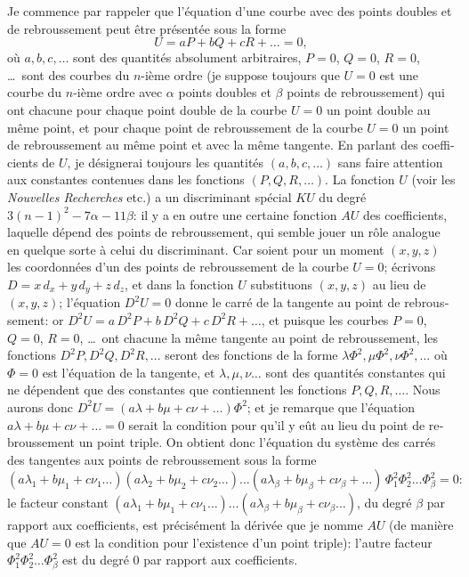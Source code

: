 \documentclass[11pt,a4paper]{article}
\begin{document}
\begin{otherlanguage}{french}
Je commence par rappeler que l'\'equation d'une courbe avec des points doubles et de rebroussement peut \^etre pr\'esent\'ee sous la forme
\[
U = aP + bQ + cR + \ldots = 0,
\]
o\`u $a, b, c, \ldots$ sont des quantit\'es absolument arbitraires, $P = 0$, $Q = 0$, $R = 0$, \ldots\ sont des courbes du $n$-i\`eme ordre (je suppose toujours que $U = 0$ est une courbe du $n$-i\`eme ordre avec $\alpha$ points doubles et $\beta$ points de rebroussement) qui ont chacune pour chaque point double de la courbe $U = 0$ un point double au m\^eme point, et pour chaque point de rebroussement de la courbe $U = 0$ un point de rebroussement au m\^eme point et avec la m\^eme tangente. En parlant des coefficients de $U$, je d\'esignerai toujours les quantit\'es $(a, b, c, \ldots)$ sans faire attention aux constantes contenues dans les fonctions $(P, Q, R, \ldots)$. La fonction $U$ (voir les \textit{Nouvelles Recherches} etc.) a un discriminant sp\'ecial $KU$ du degr\'e $3(n - 1)^{2} - 7\alpha - 11\beta$: il y a en outre une certaine fonction $AU$ des coefficients, laquelle d\'epend des points de rebroussement, qui semble jouer un r\^ole analogue en quelque sorte \`a celui du discriminant. Car soient pour un moment $(x, y, z)$ les coordonn\'ees d'un des points de rebroussement de la courbe $U = 0$; \'ecrivons $D = x\,d_{x} + y\,d_{y} + z\,d_{z}$, et dans la fonction $U$ substituons $(x, y, z)$ au lieu de $(x, y, z)$; l'\'equation $D^{2}U = 0$ donne le carr\'e de la tangente au point de rebroussement: or $D^{2}U = a\,D^{2}P + b\,D^{2}Q + c\,D^{2}R + \ldots$, et puisque les courbes $P = 0$, $Q = 0$, $R = 0$, \ldots\ ont chacune la m\^eme tangente au point de rebroussement, les fonctions $D^{2}P, D^{2}Q, D^{2}R, \ldots$ seront des fonctions de la forme $\lambda\Phi^{2}, \mu\Phi^{2}, \nu\Phi^{2}, \ldots$ o\`u $\Phi = 0$ est l'\'equation de la tangente, et $\lambda, \mu, \nu \ldots$ sont des quantit\'es constantes qui ne d\'ependent que des constantes que contiennent les fonctions $P, Q, R, \ldots$. Nous aurons donc $D^{2}U = (a\lambda + b\mu + c\nu + \ldots)\Phi^{2}$; et je remarque que l'\'equation $a\lambda + b\mu + c\nu + \ldots = 0$ serait la condition pour qu'il y e\^ut au lieu du point de rebroussement un point triple. On obtient donc l'\'equation du syst\`eme des carr\'es des tangentes aux points de rebroussement sous la forme
\[
(a\lambda_{1} + b\mu_{1} + c\nu_{1}\ldots)(a\lambda_{2} + b\mu_{2} + c\nu_{2}\ldots)\ldots(a\lambda_{\beta} + b\mu_{\beta} + c\nu_{\beta} + \ldots)\,\Phi_{1}^{2}\Phi_{2}^{2}\ldots\Phi_{\beta}^{2} = 0:
\]
le facteur constant $(a\lambda_{1} + b\mu_{1} + c\nu_{1}\ldots)\ldots(a\lambda_{\beta} + b\mu_{\beta} + c\nu_{\beta}\ldots)$, du degr\'e $\beta$ par rapport aux coefficients, est pr\'ecis\'ement la d\'eriv\'ee que je nomme $AU$ (de mani\`ere que $AU = 0$ est la condition pour l'existence d'un point triple): l'autre facteur $\Phi_{1}^{2}\Phi_{2}^{2}\ldots\Phi_{\beta}^{2}$ est du degr\'e $0$ par rapport aux coefficients.


\end{otherlanguage}
\end{document}
